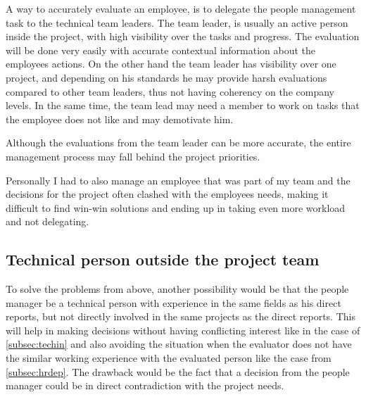 A way to accurately evaluate an employee, is to delegate the people management task to the technical team leaders. The team leader, is usually an active person inside the project, with high visibility over the tasks and progress. The evaluation will be done very easily with accurate contextual information about the employees actions. On the other hand the team leader has visibility over one project, and depending on his standards he may provide harsh evaluations compared to other team leaders, thus not having coherency on the company levels. In the same time, the team lead may need a member to work on tasks that the employee does not like and may demotivate him. 

Although the evaluations from the team leader can be more accurate, the entire management process may fall behind the project priorities. 

Personally I had to also manage an employee that was part of my team and the decisions for the project often clashed with the employees needs, making it difficult to find win-win solutions and ending up in taking even more workload and not delegating.

\subsection{Technical person outside the project team}
\label{subsec:techout}

To solve the problems from above, another possibility would be that the people manager be a technical person with experience in the same fields as his direct reports, but not directly involved in the same projects as the direct reports. This will help in making decisions without having conflicting interest like in the case of \cref{subsec:techin} and also avoiding the situation when the evaluator does not have the similar working experience with the evaluated person like the case from \cref{subsec:hrdep}. The drawback would be the fact that a decision from the people manager could be in direct contradiction with the project needs.

